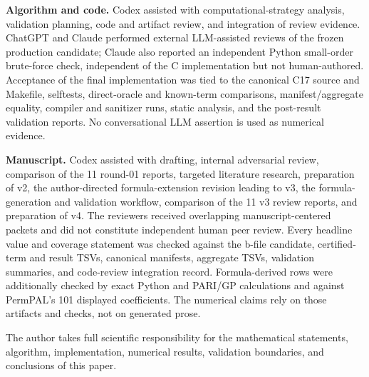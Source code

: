 \documentclass[11pt]{article}
\theoremstyle{definition}
\theoremstyle{remark}
\begin{document}
\noindent\textbf{Algorithm and code.}
Codex assisted with computational-strategy analysis, validation planning,
code and artifact review, and integration of review evidence.  ChatGPT and
Claude performed external LLM-assisted reviews of the frozen production
candidate; Claude also reported an independent Python small-order brute-force
check, independent of the C implementation but not human-authored.  Acceptance
of the final implementation was tied to the canonical C17
source and Makefile, selftests, direct-oracle and known-term comparisons,
manifest/aggregate equality, compiler and sanitizer runs, static analysis,
and the post-result validation reports.  No conversational LLM assertion is
used as numerical evidence.

\noindent\textbf{Manuscript.}
Codex assisted with drafting, internal adversarial review, comparison of the
11 round-01 reports, targeted literature research, preparation of v2, the
author-directed formula-extension revision leading to v3, the
formula-generation and validation workflow, comparison of the 11 v3 review
reports, and preparation of v4.
The reviewers received overlapping manuscript-centered packets and did not
constitute independent human peer review.  Every headline value and coverage statement was checked against
the b-file candidate, certified-term and result TSVs, canonical manifests,
aggregate TSVs, validation summaries, and code-review integration record.
Formula-derived rows were additionally checked by exact Python and PARI/GP
calculations and against PermPAL's 101 displayed coefficients.  The numerical
claims rely on those artifacts and checks, not on generated prose.

The author takes full scientific responsibility for the mathematical
statements, algorithm, implementation, numerical results, validation
boundaries, and conclusions of this paper.
\end{document}
